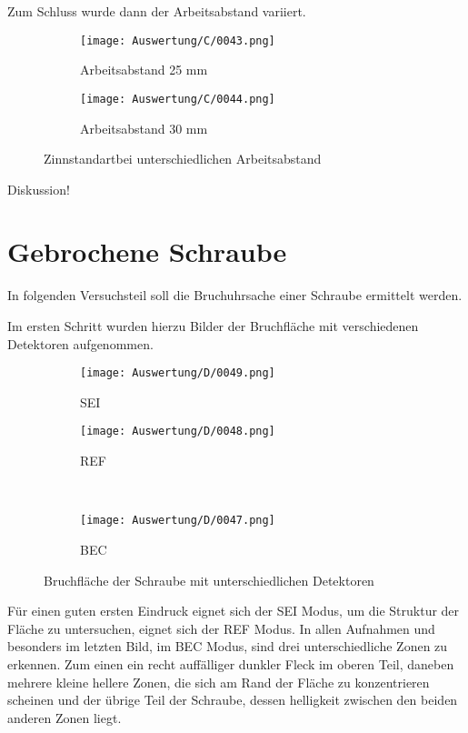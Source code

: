 \newpage
Zum Schluss wurde dann der Arbeitsabstand variiert.
\begin{figure}[h]
    \centering
    
    \begin{subfigure}[b]{0.45\textwidth}
        \centering
        \texttt{[image: Auswertung/C/0043.png]}
        \caption{Arbeitsabstand 25 mm}
    \end{subfigure}
    \hfill
    \begin{subfigure}[b]{0.45\textwidth}
        \centering
        \texttt{[image: Auswertung/C/0044.png]}
        \caption{Arbeitsabstand 30 mm}
    \end{subfigure}
    
    \caption{Zinnstandartbei unterschiedlichen Arbeitsabstand}
\end{figure}

Diskussion!

\newpage
\section{Gebrochene Schraube}

In folgenden Versuchsteil soll die Bruchuhrsache einer Schraube ermittelt werden.

Im ersten Schritt wurden hierzu Bilder der Bruchfläche mit verschiedenen Detektoren aufgenommen.
\begin{figure}[h]
    \centering
    
    \begin{subfigure}[b]{0.45\textwidth}
        \centering
        \texttt{[image: Auswertung/D/0049.png]}
        \caption{SEI}
    \end{subfigure}
    \hfill
    \begin{subfigure}[b]{0.45\textwidth}
        \centering
        \texttt{[image: Auswertung/D/0048.png]}
        \caption{REF}
    \end{subfigure}
    \\
    \begin{subfigure}[b]{0.45\textwidth}
        \centering
        \texttt{[image: Auswertung/D/0047.png]}
        \caption{BEC}
    \end{subfigure}
    \caption{Bruchfläche der Schraube mit unterschiedlichen Detektoren}
\end{figure}

Für einen guten ersten Eindruck eignet sich der SEI Modus, um die Struktur der Fläche zu untersuchen, eignet sich der REF Modus. In allen Aufnahmen und besonders im letzten Bild, im BEC Modus, sind drei unterschiedliche Zonen zu erkennen. Zum einen ein recht auffälliger dunkler Fleck im oberen Teil, daneben mehrere kleine hellere Zonen, die sich am Rand der Fläche zu konzentrieren scheinen und der übrige Teil der Schraube, dessen helligkeit zwischen den beiden anderen Zonen liegt. \\

